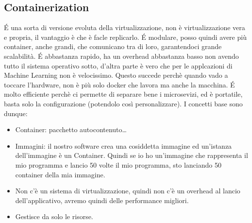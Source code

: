 \documentclass[a4paper,12pt]{article}
\begin{document}
\subsection{Containerization}
\'{E} una sorta di versione evoluta della virtualizzazione, non è virtualizzazione vera e propria, il vantaggio è che è facle replicarlo. \'{E} modulare, posso quindi avere più container, anche grandi, che comunicano tra di loro, garantendoci grande scalabilità.
\'{E} abbastanza rapido, ha un overhead abbastanza basso non avendo tutto il sistema operativo sotto, d'altra parte è vero che per le applcazioni di Machine Learning non è velocissimo. Questo succede perchè quando vado a toccare l'hardware, non è più solo docker che lavora ma anche la macchina.
\'{E} molto efficiente perchè ci permette di separare bene i microsevizi, ed è portatile, basta solo la configurazione (potendolo così personalizzare).
I concetti base sono dunque:
\begin{itemize}
    \item Container: pacchetto autocontenuto\dots
    \item Immagini: il nostro software crea una cosiddetta immagine ed un'istanza dell'immagine è un Container. Quindi se io ho un'immagine che rappresenta il mio programma e lancio 50 volte il mio programma, sto lanciando 50 container della mia immagine.
    \item Non c'è un sistema di virtualizzazione, quindi non c'è un overhead al lancio dell'applicativo, avremo quindi delle performance migliori.
    \item Gestisce da solo le risorse.
\end{itemize}
\end{document}
